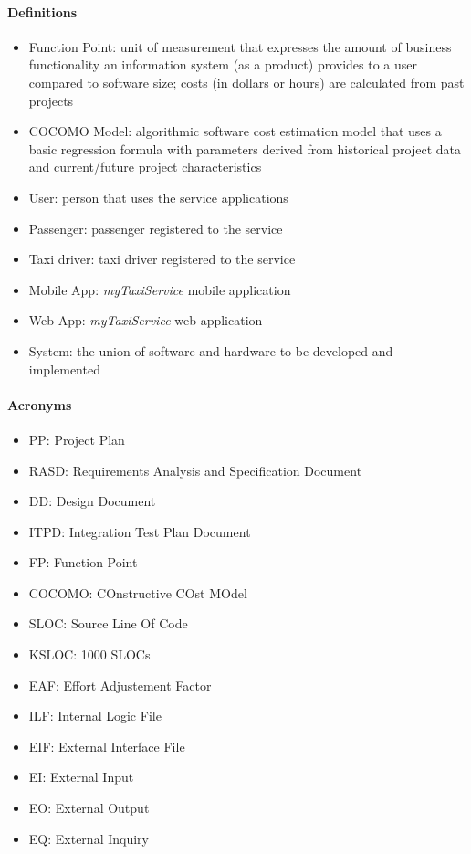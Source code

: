 \paragraph{Definitions}
	\begin{itemize}
		\item Function Point: unit of measurement that expresses the amount of business functionality an information system (as a product) provides to a user compared to software size; costs (in dollars or hours) are calculated from past projects
		\item COCOMO Model: algorithmic software cost estimation model that uses a basic regression formula with parameters derived from historical project data and current/future project characteristics
		\item User: person that uses the service applications
		\item Passenger: passenger registered to the service
		\item Taxi driver: taxi driver registered to the service
		\item Mobile App: \textit{myTaxiService} mobile application
		\item Web App: \textit{myTaxiService} web application
		\item System: the union of software and hardware to be developed and implemented
	\end{itemize}

\paragraph{Acronyms}
	\begin{itemize}
		\item PP: Project Plan
		\item RASD: Requirements Analysis and Specification Document
		\item DD: Design Document
		\item ITPD: Integration Test Plan Document
		\item FP: Function Point
		\item COCOMO: COnstructive COst MOdel
		\item SLOC: Source Line Of Code
		\item KSLOC: 1000 SLOCs
		\item EAF: Effort Adjustement Factor
		\item ILF: Internal Logic File
		\item EIF: External Interface File
		\item EI: External Input
		\item EO: External Output
		\item EQ: External Inquiry
	\end{itemize}